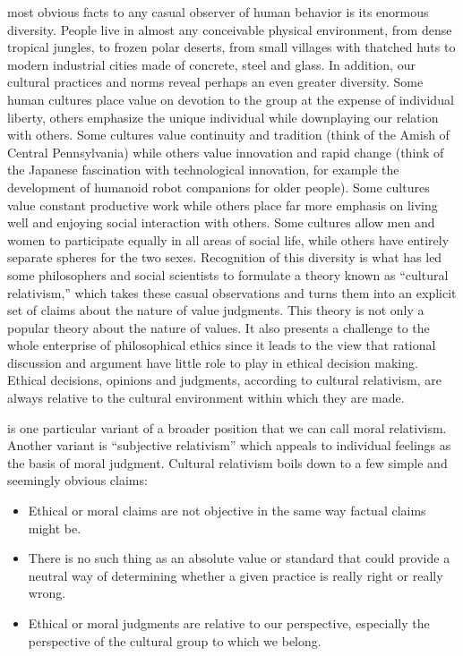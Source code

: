 \documentclass[justified]{tufte-book}
\providecommand{\tightlist}{%
  \setlength{\itemsep}{0pt}\setlength{\parskip}{0pt}}
\begin{document}
 most obvious facts to any casual observer of human behavior is its enormous diversity. People live in almost any conceivable physical environment, from dense tropical jungles, to frozen polar deserts, from small villages with thatched huts to modern industrial cities made of concrete, steel and glass. In addition, our cultural practices and norms reveal perhaps an even greater diversity. Some human cultures place value on devotion to the group at the expense of individual liberty, others emphasize the unique individual while downplaying our relation with others. Some cultures value continuity and tradition (think of the Amish of Central Pennsylvania) while others value innovation and rapid change (think of the Japanese fascination with technological innovation, for example the development of humanoid robot companions for older people). Some cultures value constant productive work while others place far more emphasis on living well and enjoying social interaction with others. Some cultures allow men and women to participate equally in all areas of social life, while others have entirely separate spheres for the two sexes. Recognition of this diversity is what has led some philosophers and social scientists to formulate a theory known as ``cultural relativism,'' which takes these casual observations and turns them into an explicit set of claims about the nature of value judgments. This theory is not only a popular theory about the nature of values. It also presents a challenge to the whole enterprise of philosophical ethics since it leads to the view that rational discussion and argument have little role to play in ethical decision making. Ethical decisions, opinions and judgments, according to cultural relativism, are always relative to the cultural environment within which they are made.

 is one particular variant of a broader position that we can call moral relativism. Another variant is ``subjective relativism'' which appeals to individual feelings as the basis of moral judgment. Cultural relativism boils down to a few simple and seemingly obvious claims:

\begin{itemize}
\tightlist
\item
  Ethical or moral claims are not objective in the same way factual claims might be.
\item
  There is no such thing as an absolute value or standard that could provide a neutral way of determining whether a given practice is really right or really wrong.
\item
  Ethical or moral judgments are relative to our perspective, especially the perspective of the cultural group to which we belong.
\end{itemize}
\end{document}
